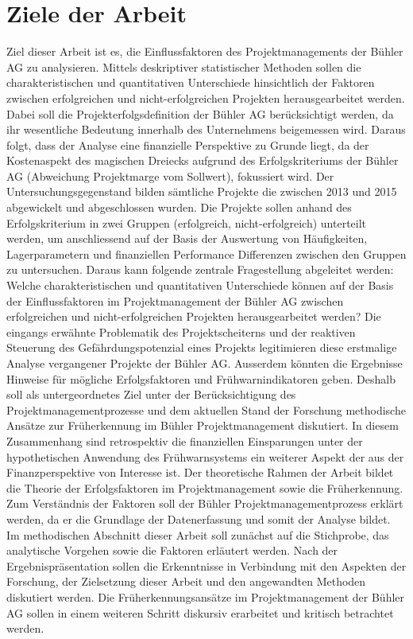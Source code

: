 \section{Ziele der Arbeit}\label{sec:zda}
Ziel dieser Arbeit ist es, die Einflussfaktoren des Projektmanagements der Bühler AG zu analysieren. Mittels deskriptiver statistischer Methoden sollen die charakteristischen und quantitativen Unterschiede hinsichtlich der Faktoren zwischen erfolgreichen und nicht-erfolgreichen Projekten herausgearbeitet werden. Dabei soll die Projekterfolgsdefinition der Bühler AG berücksichtigt werden, da ihr wesentliche Bedeutung innerhalb des Unternehmens beigemessen wird. Daraus folgt, dass der Analyse eine finanzielle Perspektive zu Grunde liegt, da der Kostenaspekt des magischen Dreiecks aufgrund des Erfolgskriteriums der Bühler AG (Abweichung Projektmarge vom Sollwert), fokussiert wird. Der Untersuchungsgegenstand bilden sämtliche Projekte die zwischen 2013 und 2015 abgewickelt und abgeschlossen wurden. Die Projekte sollen anhand des Erfolgskriterium in zwei Gruppen (erfolgreich, nicht-erfolgreich) unterteilt  werden, um anschliessend auf der Basis der Auswertung von  Häufigkeiten, Lagerparametern und finanziellen Performance Differenzen zwischen den Gruppen zu untersuchen. Daraus kann folgende zentrale Fragestellung abgeleitet werden: 
\newline\newline
Welche charakteristischen und quantitativen Unterschiede können auf der Basis der Einflussfaktoren im Projektmanagement der Bühler AG zwischen erfolgreichen und nicht-erfolgreichen Projekten herausgearbeitet werden? 
\newline\newline
Die eingangs erwähnte Problematik des Projektscheiterns und der reaktiven Steuerung des Gefährdungspotenzial eines Projekts legitimieren diese erstmalige Analyse vergangener Projekte der Bühler AG. Ausserdem könnten die Ergebnisse Hinweise für mögliche Erfolgsfaktoren und Frühwarnindikatoren geben. Deshalb soll als untergeordnetes Ziel unter der Berücksichtigung des Projektmanagementprozesse und dem aktuellen Stand der Forschung methodische Ansätze zur Früherkennung im Bühler Projektmanagement diskutiert. In diesem Zusammenhang sind retrospektiv die finanziellen Einsparungen unter der hypothetischen Anwendung des Frühwarnsystems ein weiterer Aspekt der aus der Finanzperspektive von Interesse ist. 
\newline\newline
Der theoretische Rahmen der Arbeit bildet die Theorie der Erfolgsfaktoren im Projektmanagement sowie die Früherkennung. Zum Verständnis der Faktoren soll der Bühler Projektmanagementprozess erklärt werden, da er die Grundlage der Datenerfassung und somit der Analyse bildet. Im methodischen Abschnitt dieser Arbeit soll zunächst auf die Stichprobe, das analytische Vorgehen sowie die Faktoren erläutert werden. Nach der Ergebnispräsentation sollen die Erkenntnisse in Verbindung mit den Aspekten der Forschung, der Zielsetzung dieser Arbeit und den angewandten Methoden diskutiert werden. Die Früherkennungsansätze im Projektmanagement der Bühler AG sollen in einem weiteren Schritt diskursiv erarbeitet und kritisch betrachtet werden.
